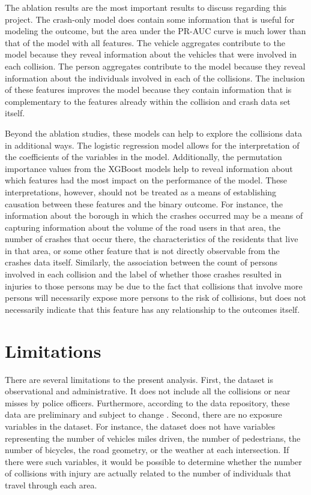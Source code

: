 \documentclass{article}
\begin{document}
The ablation results are the most important results to discuss regarding this project. The crash-only model does contain some information that is useful for modeling the outcome, but the area under the PR-AUC curve is much lower than that of the model with all features. The vehicle aggregates contribute to the model because they reveal information about the vehicles that were involved in each collision. The person aggregates contribute to the model because they reveal information about the individuals involved in each of the collisions. The inclusion of these features improves the model because they contain information that is complementary to the features already within the collision and crash data set itself.

Beyond the ablation studies, these models can help to explore the collisions data in additional ways. The logistic regression model allows for the interpretation of the coefficients of the variables in the model. Additionally, the permutation importance values from the XGBoost models help to reveal information about which features had the most impact on the performance of the model. These interpretations, however, should not be treated as a means of establishing causation between these features and the binary outcome. For instance, the information about the borough in which the crashes occurred may be a means of capturing information about the volume of the road users in that area, the number of crashes that occur there, the characteristics of the residents that live in that area, or some other feature that is not directly observable from the crashes data itself. Similarly, the association between the count of persons involved in each collision and the label of whether those crashes resulted in injuries to those persons may be due to the fact that collisions that involve more persons will necessarily expose more persons to the risk of collisions, but does not necessarily indicate that this feature has any relationship to the outcomes itself.

\section{Limitations}
There are several limitations to the present analysis. First, the dataset is observational and administrative. It does not include all the collisions or near misses by police officers. Furthermore, according to the data repository, these data are preliminary and subject to change \citep{nyc_crashes}. Second, there are no exposure variables in the dataset. For instance, the dataset does not have variables representing the number of vehicles miles driven, the number of pedestrians, the number of bicycles, the road geometry, or the weather at each intersection. If there were such variables, it would be possible to determine whether the number of collisions with injury are actually related to the number of individuals that travel through each area.
\end{document}
